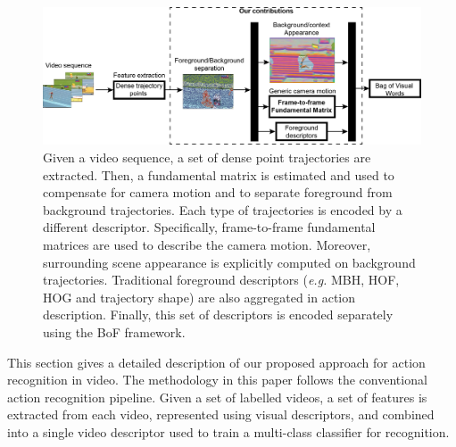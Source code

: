 \documentclass[runningheads]{llncs}
\begin{document}
\begin{figure}[t!]
\begin{center}
\includegraphics[width=0.98\linewidth]{pipeline.png}
\end{center}
\vspace{-12pt}\caption{Given a video sequence, a set of dense point trajectories are extracted. Then, a fundamental matrix is estimated and used to compensate for camera motion and to separate foreground from background trajectories. Each type of trajectories is encoded by a different descriptor. Specifically, frame-to-frame fundamental matrices are used to describe the camera motion. Moreover, surrounding scene appearance is explicitly computed on background trajectories. Traditional foreground descriptors (\emph{e.g.} MBH, HOF, HOG and trajectory shape) are also aggregated in action description. Finally, this set of descriptors is encoded separately using the BoF framework.}
\label{fig:pipeline}\vspace{-6pt}
\end{figure}

This section gives a detailed description of our proposed approach for action recognition in video. The methodology in this paper follows the conventional action recognition pipeline. Given a set of labelled videos, a set of features is extracted from each video, represented using visual descriptors, and combined into a single video descriptor used to train a multi-class classifier for recognition.
\end{document}
